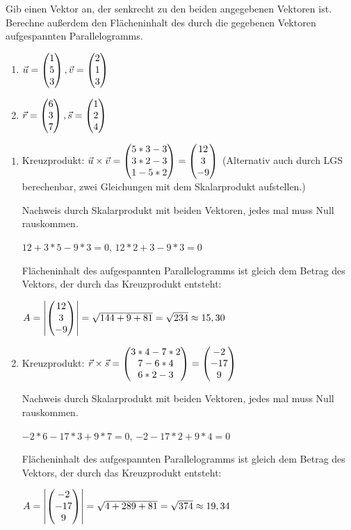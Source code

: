 Gib einen Vektor an, der senkrecht zu den beiden angegebenen Vektoren ist. Berechne außerdem den Flächeninhalt des durch die gegebenen Vektoren aufgespannten Parallelogramms.
\begin{enumerate}
	\item$\vec u=\begin{pmatrix} 1\\5\\3 \end{pmatrix},\vec v=\begin{pmatrix} 2\\1\\3 \end{pmatrix}$
	\item$\vec r=\begin{pmatrix} 6\\3\\7 \end{pmatrix},\vec s=\begin{pmatrix} 1\\2\\4 \end{pmatrix}$
\end{enumerate}
\begin{lsg}{}
	\begin{enumerate}
		\item Kreuzprodukt: $\vec u\times \vec v=\begin{pmatrix} 5*3-3\\3*2-3\\1-5*2 \end{pmatrix}=\begin{pmatrix} 12\\3\\-9 \end{pmatrix}$
		(Alternativ auch durch LGS berechenbar, zwei Gleichungen mit dem Skalarprodukt aufstellen.)

		Nachweis durch Skalarprodukt mit beiden Vektoren, jedes mal muss Null rauskommen.

		$12+3*5-9*3=0$, $12*2+3-9*3=0$

		Flächeninhalt des aufgespannten Parallelogramms ist gleich dem Betrag des Vektors, der durch das Kreuzprodukt entsteht:

		$A=\left|\begin{pmatrix} 12\\3\\-9 \end{pmatrix}\right|=\sqrt{144+9+81}=\sqrt{234}\approx 15,30$
		\item Kreuzprodukt: $\vec r\times \vec s=\begin{pmatrix} 3*4-7*2\\7-6*4\\6*2-3 \end{pmatrix}=\begin{pmatrix} -2\\-17\\9 \end{pmatrix}$

		Nachweis durch Skalarprodukt mit beiden Vektoren, jedes mal muss Null rauskommen.

		$-2*6-17*3+9*7=0$, $-2-17*2+9*4=0$

		Flächeninhalt des aufgespannten Parallelogramms ist gleich dem Betrag des Vektors, der durch das Kreuzprodukt entsteht:

		$A=\left|\begin{pmatrix} -2\\-17\\9 \end{pmatrix}\right|=\sqrt{4+289+81}=\sqrt{374}\approx 19,34$
	\end{enumerate}
\end{lsg}


